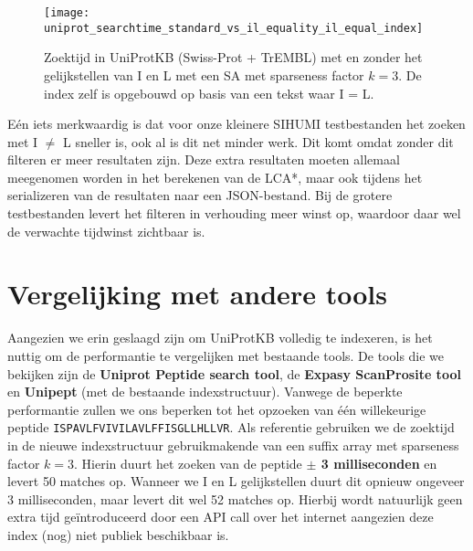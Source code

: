\begin{figure}[ht]
    \centering
    \texttt{[image: uniprot\_searchtime\_standard\_vs\_il\_equality\_il\_equal\_index]}
    \caption{Zoektijd in UniProtKB (Swiss-Prot + TrEMBL) met en zonder het gelijkstellen van I en L met een SA met sparseness factor $k = 3$. De index zelf is opgebouwd op basis van een tekst waar I = L.}
    \label{fig:uniprot_search_il_equal}
\end{figure}

Eén iets merkwaardig is dat voor onze kleinere SIHUMI testbestanden het zoeken met I $\neq$ L sneller is, ook al is dit net minder werk.
Dit komt omdat zonder dit filteren er meer resultaten zijn.
Deze extra resultaten moeten allemaal meegenomen worden in het berekenen van de LCA*, maar ook tijdens het serializeren van de resultaten naar een JSON-bestand.
Bij de grotere testbestanden levert het filteren in verhouding meer winst op, waardoor daar wel de verwachte tijdwinst zichtbaar is.

\section{Vergelijking met andere tools}\label{subsec:vergelijking-met-andere-tools}
Aangezien we erin geslaagd zijn om UniProtKB volledig te indexeren, is het nuttig om de performantie te vergelijken met bestaande tools.
De tools die we bekijken zijn de \textbf{Uniprot Peptide search tool}, de \textbf{Expasy ScanProsite tool} en \textbf{Unipept} (met de bestaande indexstructuur).
Vanwege de beperkte performantie zullen we ons beperken tot het opzoeken van één willekeurige peptide \texttt{ISPAVLFVIVILAVLFFISGLLHLLVR}.
Als referentie gebruiken we de zoektijd in de nieuwe indexstructuur gebruikmakende van een suffix array met sparseness factor $k = 3$.
Hierin duurt het zoeken van de peptide \textbf{$\pm$ 3 milliseconden} en levert 50 matches op.
Wanneer we I en L gelijkstellen duurt dit opnieuw ongeveer 3 milliseconden, maar levert dit wel 52 matches op.
Hierbij wordt natuurlijk geen extra tijd geïntroduceerd door een API call over het internet aangezien deze index (nog) niet publiek beschikbaar is.


